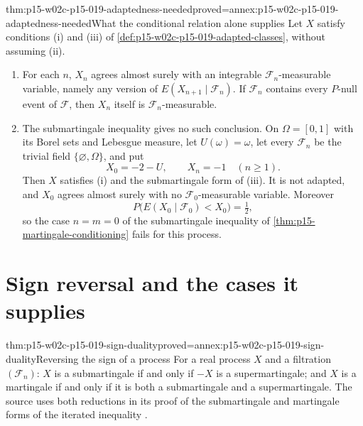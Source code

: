 \begin{hbtheorem}{thm:p15-w02c-p15-019-adaptedness-needed}{proved=annex:p15-w02c-p15-019-adaptedness-needed}{What the conditional relation alone supplies}
Let \(X\) satisfy conditions (i) and (iii) of
\cref{def:p15-w02c-p15-019-adapted-classes}, without assuming (ii).
\begin{enumerate}
\item For each \(n\), \(X_n\) agrees almost surely with an integrable
      \(\mathcal F_n\)-measurable variable, namely any version of
      \(E(X_{n+1}\mid\mathcal F_n)\). If \(\mathcal F_n\) contains every
      \(P\)-null event of \(\mathcal F\), then \(X_n\) itself is
      \(\mathcal F_n\)-measurable.
\item The submartingale inequality gives no such conclusion. On
      \(\Omega=[0,1]\) with its Borel sets and Lebesgue measure, let
      \(U(\omega)=\omega\), let every \(\mathcal F_n\) be the trivial
      field \(\{\varnothing,\Omega\}\), and put
      \[
                 X_0=-2-U,\qquad X_n=-1\quad(n\geq1).
      \]
      Then \(X\) satisfies (i) and the submartingale form of (iii).
      It is not adapted, and \(X_0\) agrees almost surely with no
      \(\mathcal F_0\)-measurable variable. Moreover
      \[
           P\bigl(E(X_0\mid\mathcal F_0)<X_0\bigr)=\tfrac12 ,
      \]
      so the case \(n=m=0\) of the submartingale inequality of
      \cref{thm:p15-martingale-conditioning} fails for this process.
\end{enumerate}
\end{hbtheorem}

\section{Sign reversal and the cases it supplies}
\label{sec:p15-w02c-p15-019-sign}

\begin{hblemma}{thm:p15-w02c-p15-019-sign-duality}{proved=annex:p15-w02c-p15-019-sign-duality}{Reversing the sign of a process}
For a real process \(X\) and a filtration \((\mathcal F_n)\):
\(X\) is a submartingale if and only if \(-X\) is a supermartingale;
and \(X\) is a martingale if and only if it is both a submartingale and a
supermartingale.
The source uses both reductions in its proof of the submartingale and
martingale forms of the iterated inequality
\cite[thm.~4.2.5, p.~218]{DurrettPTEAuthor2019}.
\end{hblemma}

